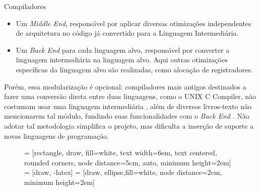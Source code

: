 \begin{section}{Compiladores}
\begin{itemize}
    \item Um \textit{Middle End}, responsável por aplicar diversas otimizações
independentes de arquitetura no código já convertido para a Linguagem Intermediária.

    \item Um \textit{Back End} para cada linguagem alvo, responsável por converter a linguagem intermediária
na linguagem alvo. Aqui outras otimizações específicas da linguagem alvo são realizadas,
como alocação de registradores.

\end{itemize}

Porém, essa modularização é opcional: compiladores mais antigos destinados a fazer uma
conversão direta entre duas linguagens, como o UNIX C Compiler, não costumam usar uma linguagem
intermediária \citep{ritchie1979tour}, além de diversos livros-texto não mencionarem tal módulo, fundindo suas
funcionalidades com o \textit{Back End} \citep{dragonbook}. Não adotar tal metodologia
simplifica o projeto, mas dificulta a inserção de suporte a novas
linguagens de programação.


\begin{figure}
 = [rectangle, draw, fill=white,
    text width=6em, text centered, rounded corners, node distance=5cm, auto, minimum height=2em]
 = [draw, -latex]
 = [draw, ellipse,fill=white, node distance=2cm,
    minimum height=2em]

\begin{center}
\end{center}
\end{figure}
\end{section}
